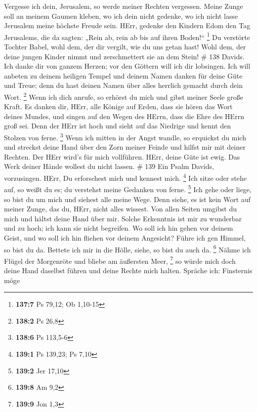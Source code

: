 Vergesse ich dein, Jerusalem, so werde meiner Rechten vergessen.
 Meine Zunge soll an meinem Gaumen kleben, wo ich dein nicht
gedenke, wo ich nicht lasse Jerusalem meine höchste Freude sein.
 HErr, gedenke den Kindern Edom den Tag Jerusalems, die da
sagten: „Rein ab, rein ab bis auf ihren Boden!{}`` \footnote{\textbf{137:7}
  Ps 79,12; Ob 1,10-15}  Du verstörte Tochter Babel, wohl
dem, der dir vergilt, wie du uns getan hast!  Wohl dem, der
deine jungen Kinder nimmt und zerschmettert sie an dem Stein! \# 138
 Davids. Ich danke dir von ganzem Herzen; vor den Göttern
will ich dir lobsingen.  Ich will anbeten zu deinem heiligen
Tempel und deinem Namen danken für deine Güte und Treue; denn du hast
deinen Namen über alles herrlich gemacht durch dein Wort. \footnote{\textbf{138:2}
  Ps 26,8}  Wenn ich dich anrufe, so erhörst du mich und
gibst meiner Seele große Kraft.  Es danken dir, HErr, alle
Könige auf Erden, dass sie hören das Wort deines Mundes, 
und singen auf den Wegen des HErrn, dass die Ehre des HErrn groß sei.
 Denn der HErr ist hoch und sieht auf das Niedrige und kennt
den Stolzen von ferne. \footnote{\textbf{138:6} Ps 113,5-6} 
Wenn ich mitten in der Angst wandle, so erquickst du mich und streckst
deine Hand über den Zorn meiner Feinde und hilfst mir mit deiner
Rechten.  Der HErr wird's für mich vollführen. HErr, deine
Güte ist ewig. Das Werk deiner Hände wollest du nicht lassen. \# 139
 Ein Psalm Davids, vorzusingen. HErr, Du erforschest mich
und kennest mich. \footnote{\textbf{139:1} Ps 139,23; Ps 7,10}
 Ich sitze oder stehe auf, so weißt du es; du verstehst
meine Gedanken von ferne. \footnote{\textbf{139:2} Jer 17,10}
 Ich gehe oder liege, so bist du um mich und siehest alle
meine Wege.  Denn siehe, es ist kein Wort auf meiner Zunge,
das du, HErr, nicht alles wissest.  Von allen Seiten umgibst
du mich und hältst deine Hand über mir.  Solche Erkenntnis
ist mir zu wunderbar und zu hoch; ich kann sie nicht begreifen.
 Wo soll ich hin gehen vor deinem Geist, und wo soll ich hin
fliehen vor deinem Angesicht?  Führe ich gen Himmel, so bist
du da. Bettete ich mir in die Hölle, siehe, so bist du auch da.
\footnote{\textbf{139:8} Am 9,2}  Nähme ich Flügel der
Morgenröte und bliebe am äußersten Meer, \footnote{\textbf{139:9} Jon
  1,3}  so würde mich doch deine Hand daselbst führen und
deine Rechte mich halten.  Spräche ich: Finsternis möge
